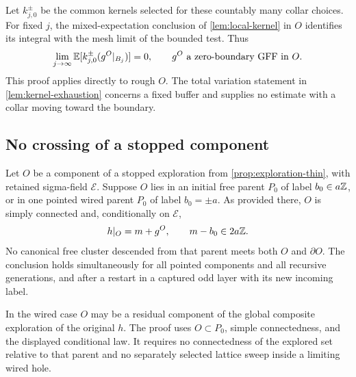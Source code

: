 Let \(k_{j,0}^{\pm}\) be the common kernels selected for these
countably many collar choices. For fixed \(j\), the mixed-expectation
conclusion of \cref{lem:local-kernel} in \(O\) identifies its integral
with the mesh limit of the bounded test. Thus
\begin{equation}
       \lim_{j\to\infty}
       \mathbb E[k_{j,0}^{\pm}(g^O|_{B_j})]=0,
       \qquad g^O\text{ a zero-boundary GFF in }O.
 \label{eq:zero-boundary-kernel}
\end{equation}
This proof applies directly to rough \(O\). The total variation statement
in \cref{lem:kernel-exhaustion} concerns a fixed buffer and supplies no
estimate with a collar moving toward the boundary.

\subsection{No crossing of a stopped component}

\begin{proposition}[No crossing]
\label{prop:no-crossing}
Let \(O\) be a component of a stopped exploration from
\cref{prop:exploration-thin}, with retained sigma-field \(\mathscr E\).
Suppose \(O\) lies in an initial free parent \(P_0\) of label \(b_0\in a\mathbb Z\), or in
one pointed wired parent \(P_0\) of label \(b_0=\pm a\). As provided there,
\(O\) is simply connected and, conditionally on \(\mathscr E\),
\[
              h|_O=m+g^O,\qquad m-b_0\in2a\mathbb Z.
\]
No canonical free cluster descended from that parent meets both \(O\)
and \(\partial O\). The conclusion holds simultaneously for all
pointed components and all recursive generations, and after a restart
in a captured odd layer with its new incoming label.

In the wired case \(O\) may be a residual component of the global
composite exploration of the original \(h\). The proof uses
\(O\subset P_0\), simple connectedness, and the
displayed conditional law. It requires no connectedness of the
explored set relative to that parent and no separately selected
lattice sweep inside a limiting wired hole.
\end{proposition}

